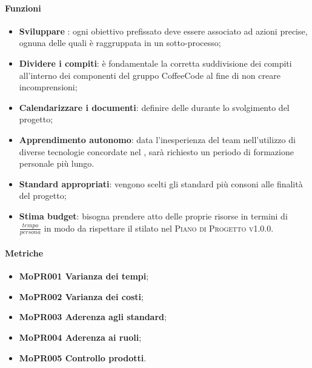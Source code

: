 \documentclass[../piano-di-qualifica.tex]{subfiles}
\begin{document}
\paragraph{Funzioni}
\label{sub:funzioni_1}

\begin{itemize}
    \item \textbf{Sviluppare }: ogni obiettivo prefissato deve essere associato ad azioni precise, ognuna delle quali è raggruppata in un sotto-processo;
    \item \textbf{Dividere i compiti}: è fondamentale la corretta suddivisione dei compiti all'interno dei componenti del gruppo CoffeeCode al fine di non creare incomprensioni;
    \item \textbf{Calendarizzare i documenti}: definire delle  durante lo svolgimento del progetto;
    \item \textbf{Apprendimento autonomo}: data l'inesperienza del team nell'utilizzo di diverse tecnologie concordate nel , sarà richiesto un periodo di formazione personale più lungo.
    \item \textbf{Standard appropriati}: vengono scelti gli standard più consoni alle finalità del progetto;
    \item \textbf{Stima budget}: bisogna prendere atto delle proprie risorse in termini di $\frac{tempo}{persona}$ in modo da rispettare il  stilato nel \textsc{Piano di Progetto v1.0.0}.
\end{itemize}

\paragraph{Metriche}
\label{sub:metriche_1}
\begin{itemize}
    \item \textbf{MoPR001 Varianza dei tempi};
    \item \textbf{MoPR002 Varianza dei costi};
    \item \textbf{MoPR003 Aderenza agli standard};
    \item \textbf{MoPR004 Aderenza ai ruoli};
    \item \textbf{MoPR005 Controllo prodotti}.
\end{itemize}
\end{document}
